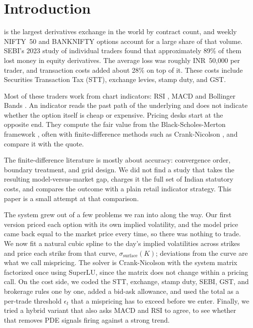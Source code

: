 \documentclass[10pt,journal,compsoc]{IEEEtran}
\begin{document}
\maketitle
\IEEEdisplaynontitleabstractindextext
\IEEEpeerreviewmaketitle

\section{Introduction}
 is the largest derivatives exchange in the world by contract count, and weekly NIFTY~50 and BANKNIFTY options account for a large share of that volume. SEBI's 2023 study of individual traders \cite{sebi2023study} found that approximately 89\% of them lost money in equity derivatives. The average loss was roughly INR~50,000 per trader, and transaction costs added about 28\% on top of it. These costs include Securities Transaction Tax (STT), exchange levies, stamp duty, and GST.

Most of these traders work from chart indicators: RSI \cite{wilder1978new}, MACD \cite{appel2005technical} and Bollinger Bands \cite{bollinger2001bollinger}. An indicator reads the past path of the underlying and does not indicate whether the option itself is cheap or expensive. Pricing desks start at the opposite end. They compute the fair value from the Black-Scholes-Merton framework \cite{black1973pricing, merton1973theory}, often with finite-difference methods such as Crank-Nicolson \cite{crank1947practical}, and compare it with the quote.

The finite-difference literature \cite{duffy2006finite, wilmott2006paul} is mostly about accuracy: convergence order, boundary treatment, and grid design. We did not find a study that takes the resulting model-versus-market gap, charges it the full set of Indian statutory costs, and compares the outcome with a plain retail indicator strategy. This paper is a small attempt at that comparison.

The system grew out of a few problems we ran into along the way. Our first version priced each option with its own implied volatility, and the model price came back equal to the market price every time, so there was nothing to trade. We now fit a natural cubic spline to the day's implied volatilities across strikes and price each strike from that curve, $\sigma_{\text{surface}}(K)$; deviations from the curve are what we call mispricing. The solver is Crank-Nicolson with the system matrix factorized once using SuperLU, since the matrix does not change within a pricing call. On the cost side, we coded the STT, exchange, stamp duty, SEBI, GST, and brokerage rules one by one, added a bid-ask allowance, and used the total as a per-trade threshold $\epsilon_t$ that a mispricing has to exceed before we enter. Finally, we tried a hybrid variant that also asks MACD and RSI to agree, to see whether that removes PDE signals firing against a strong trend.
\end{document}
